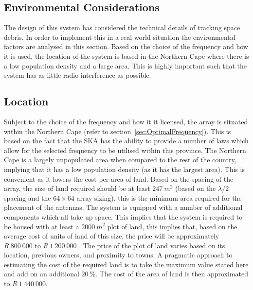 \documentclass[11pt]{witseiepaper}
\begin{document}
\begin{bibunit}[witseie]
\section{Environmental Considerations} \label{sec:EnvironmentalConsiderations}
The design of this system has considered the technical details of tracking space debris. In order to implement this in a real world situation the environmental factors are analysed in this section.
Based on the choice of the frequency and how it is used, the location of the system is based in the Northern Cape where there is a low population density and a large area. This is highly important such that the system has as little radio interference as possible.

\subsection{Location} \label{sec:Location}
Subject to the choice of the frequency and how it it licensed, the array is situated within the Northern Cape (refer to section~\ref{sec:OptimalFrequency}). This is based on the fact that the SKA has the ability to provide a number of laws which allow for the selected frequency to be utilised within this province.
The Northern Cape is a largely unpopulated area when compared to the rest of the country, implying that it has a low population density (as it has the largest area). This is convenient as it lowers the cost per area of land. 
Based on the spacing of the array, the size of land required should be at least $247~m^2$ (based on the $\lambda/2$ spacing and the $64 \times 64$ array sizing), this is the minimum area required for the placement of the antennas. The system is equipped with a number of additional components which all take up space.
This implies that the system is required to be housed with at least a $2000~m^2$ plot of land, this implies that, based on the average cost of units of land of this size, the price will be approximately $R~800~000$ to $R~1~200~000$ \cite{LocationPrice1, LocationPrice2, LocationPrice3}.
The price of the plot of land varies based on its location, previous owners, and proximity to towns. A pragmatic approach to estimating the cost of the required land is to take the maximum value stated here and add on an additional $20~\%$. The cost of the area of land is then approximated to $R~1~440~000$.


\end{bibunit}
\end{document}
